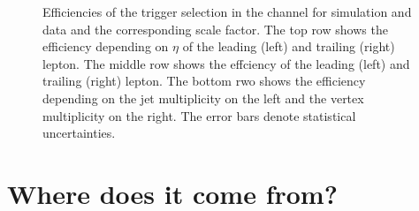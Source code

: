 \begin{figure}[htbp!]
\begin{center}
      \caption{Efficiencies of the trigger selection in the \emu channel for simulation and data and the corresponding scale factor. The top row shows the efficiency depending on $\eta$ of the leading (left) and trailing (right) lepton. The middle row shows the effciency \pt of the leading (left) and trailing (right) lepton. The bottom rwo shows the efficiency depending on the jet multiplicity on the left and the vertex multiplicity on the right.
      The error bars denote statistical uncertainties. }  
      
    \label{fig:MET_emu}
  \end{center}
\end{figure}


\section{Where does it come from?}  %
\label{section1.3}

